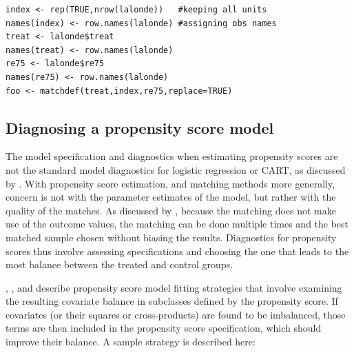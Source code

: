 \documentclass[oneside,letterpaper,titlepage]{article}
\begin{document}
\begin{verbatim}
index <- rep(TRUE,nrow(lalonde))   #keeping all units
names(index) <- row.names(lalonde) #assigning obs names
treat <- lalonde$treat
names(treat) <- row.names(lalonde)
re75 <- lalonde$re75
names(re75) <- row.names(lalonde)
foo <- matchdef(treat,index,re75,replace=TRUE)
\end{verbatim}

\subsection{Diagnosing a propensity score model}
The model specification and diagnostics when estimating propensity scores are not the standard model diagnostics
for logistic regression or CART, as
discussed by \cite{Rubin04}.  With propensity score estimation, and matching methods more generally, concern is not with the parameter estimates
of the model, but rather with the quality of the matches.  As discussed by \cite{Greevy04}, because the matching does not make use of
the outcome values, the matching can 
be done multiple times and the 
best matched sample chosen without biasing the results.  Diagnostics for propensity scores thus involve assessing specifications and choosing
the one that leads to the most balance between the treated and control groups.

\cite{RosRub84a}, \cite{Perkins00}, and \cite{DehWah02} describe propensity score model fitting strategies 
that involve examining the resulting covariate balance in subclasses defined by the propensity score.  If 
covariates (or their squares or cross-products) are found to be imbalanced, those terms are then included in the propensity
score specification, which should improve their balance.  A sample strategy is described here:
\end{document}
